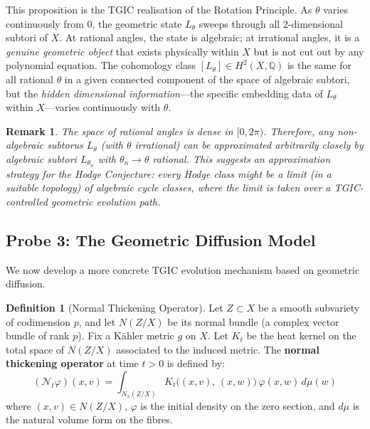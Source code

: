 \documentclass[11pt,a4paper]{article}
\theoremstyle{definition}
\newtheorem{definition}{Definition}[section]
\theoremstyle{plain}
\newtheorem{remark}[theorem]{Remark}
\newcommand{\QQ}{\mathbb{Q}}
\begin{document}
This proposition is the TGIC realisation of the Rotation Principle. As $\theta$ varies continuously from $0$, the geometric state $L_\theta$ sweeps through all $2$-dimensional subtori of $X$. At rational angles, the state is algebraic; at irrational angles, it is a \emph{genuine geometric object} that exists physically within $X$ but is not cut out by any polynomial equation. The cohomology class $[L_\theta] \in H^2(X, \QQ)$ is the same for all rational $\theta$ in a given connected component of the space of algebraic subtori, but the \emph{hidden dimensional information}---the specific embedding data of $L_\theta$ within $X$---varies continuously with $\theta$.

\begin{remark}\label{rmk:rational-approx}
The space of rational angles is dense in $[0, 2\pi)$. Therefore, any non-algebraic subtorus $L_\theta$ (with $\theta$ irrational) can be approximated arbitrarily closely by algebraic subtori $L_{\theta_n}$ with $\theta_n \to \theta$ rational. This suggests an approximation strategy for the Hodge Conjecture: every Hodge class might be a limit (in a suitable topology) of algebraic cycle classes, where the limit is taken over a TGIC-controlled geometric evolution path.
\end{remark}

\subsection{Probe 3: The Geometric Diffusion Model}

We now develop a more concrete TGIC evolution mechanism based on geometric diffusion.

\begin{definition}[Normal Thickening Operator]\label{def:thicken}
Let $Z \subset X$ be a smooth subvariety of codimension $p$, and let $N(Z/X)$ be its normal bundle (a complex vector bundle of rank $p$). Fix a K\"ahler metric $g$ on $X$. Let $K_t$ be the heat kernel on the total space of $N(Z/X)$ associated to the induced metric. The \textbf{normal thickening operator} at time $t > 0$ is defined by:
\begin{equation}\label{eq:thicken}
(\mathcal{N}_t \varphi)(x, v) = \int_{N_x(Z/X)} K_t\bigl((x,v),\, (x,w)\bigr)\, \varphi(x,w)\, d\mu(w)
\end{equation}
where $(x,v) \in N(Z/X)$, $\varphi$ is the initial density on the zero section, and $d\mu$ is the natural volume form on the fibres.
\end{definition}
\end{document}
